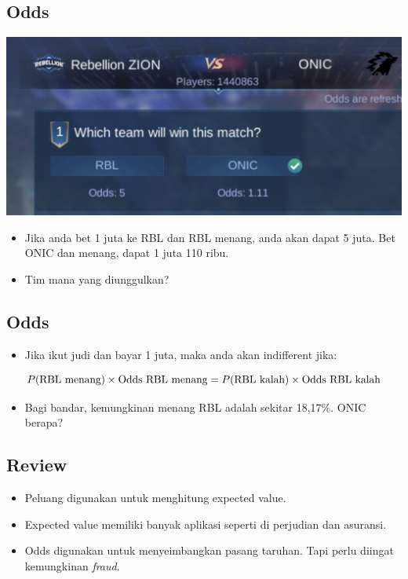 \documentclass[
  letterpaper,
  DIV=11,
  numbers=noendperiod]{scrartcl}
\providecommand{\tightlist}{%
  \setlength{\itemsep}{0pt}\setlength{\parskip}{0pt}}\usepackage{longtable,booktabs,array}
\begin{document}
\subsection{Odds}\label{odds-2}

\includegraphics{bet.jpg}

\begin{itemize}
\item
  Jika anda bet 1 juta ke RBL dan RBL menang, anda akan dapat 5 juta.
  Bet ONIC dan menang, dapat 1 juta 110 ribu.
\item
  Tim mana yang diunggulkan?
\end{itemize}

\subsection{Odds}\label{odds-3}

\begin{itemize}
\tightlist
\item
  Jika ikut judi dan bayar 1 juta, maka anda akan indifferent jika:
\end{itemize}

\[
P(\text{RBL menang}) \times \text{Odds RBL menang} = \\ P(\text{RBL kalah}) \times \text{Odds RBL kalah}
\]

\begin{itemize}
\tightlist
\item
  Bagi bandar, kemungkinan menang RBL adalah sekitar 18,17\%. ONIC
  berapa?
\end{itemize}

\subsection{Review}\label{review-1}

\begin{itemize}
\item
  Peluang digunakan untuk menghitung expected value.
\item
  Expected value memiliki banyak aplikasi seperti di perjudian dan
  asuransi.
\item
  Odds digunakan untuk menyeimbangkan pasang taruhan. Tapi perlu diingat
  kemungkinan \emph{fraud}.
\end{itemize}
\end{document}
